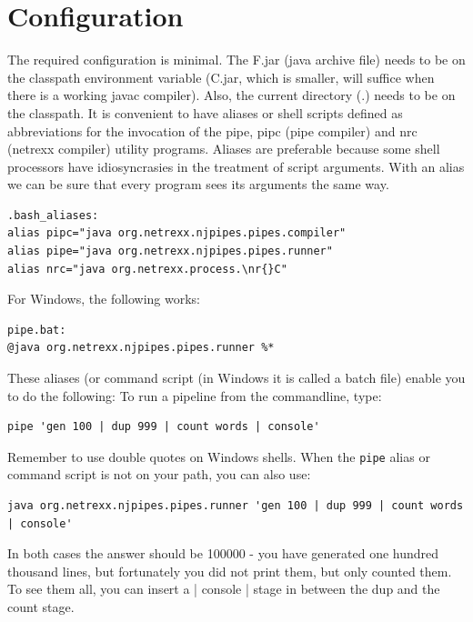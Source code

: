 \section{Configuration}
The required configuration is minimal. The \nr{}F.jar (java archive
file) needs to be on the classpath environment variable (\nr{}C.jar, which is smaller, will suffice when there is a working javac compiler). Also, the current directory (.) needs to be on the classpath.
It is convenient to have aliases or shell scripts defined as abbreviations for the invocation of the pipe, pipc (pipe compiler) and nrc (netrexx compiler) utility programs. 
Aliases are preferable because some shell processors have
idiosyncrasies in the treatment of script arguments. With an alias we
can be sure that every \nr{} program sees its arguments the same
way.
\begin{verbatim}
.bash_aliases:
alias pipc="java org.netrexx.njpipes.pipes.compiler"
alias pipe="java org.netrexx.njpipes.pipes.runner"
alias nrc="java org.netrexx.process.\nr{}C"
\end{verbatim}
For Windows, the following works:
\begin{verbatim}
pipe.bat:
@java org.netrexx.njpipes.pipes.runner %*
\end{verbatim}
These aliases (or command script (in Windows it is called a batch
file) enable you to do the following:
 To run a pipeline from the commandline, type:
\begin{lstlisting}
pipe 'gen 100 | dup 999 | count words | console'
\end{lstlisting}

Remember to use double quotes on Windows shells. When the \texttt{pipe}
alias or command script is not on your path, you can also use:

\begin{lstlisting}
java org.netrexx.njpipes.pipes.runner 'gen 100 | dup 999 | count words | console'
\end{lstlisting}

In both cases the answer should be 100000 - you have generated one
hundred thousand lines, but fortunately you did not print them, but
only counted them. To see them all, you can insert a | console | stage
in between the dup and the count stage.



